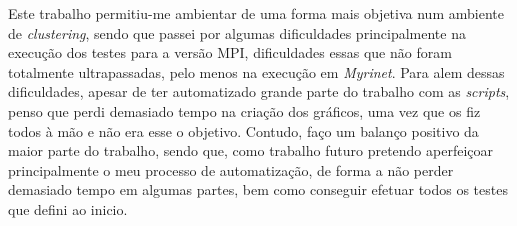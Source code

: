 \documentclass[conference,compsoc]{IEEEtran}
\begin{document}
Este trabalho permitiu-me ambientar de uma forma mais objetiva num ambiente de \textit{clustering}, sendo que passei por algumas dificuldades principalmente na execução dos testes para a versão MPI, dificuldades essas que não foram totalmente ultrapassadas, pelo menos na execução em \textit{Myrinet}. Para alem dessas dificuldades, apesar de ter automatizado grande parte do trabalho com as \textit{scripts}, penso que perdi demasiado tempo na criação dos gráficos, uma vez que os fiz todos à mão e não era esse o objetivo. Contudo, faço um balanço positivo da maior parte do trabalho, sendo que, como trabalho futuro pretendo aperfeiçoar principalmente o meu processo de automatização, de forma a não perder demasiado tempo em algumas partes, bem como conseguir efetuar todos os testes que defini ao inicio. 

%
%

\end{document}
